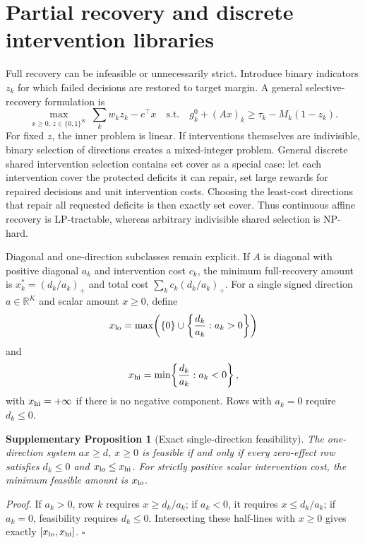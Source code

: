 \documentclass[11pt,letterpaper]{article}
\theoremstyle{plain}
\newtheorem{proposition}{Supplementary Proposition}
\newcommand{\1}{\mathbf 1}
\begin{document}
\section{Partial recovery and discrete intervention libraries}
Full recovery can be infeasible or unnecessarily strict. Introduce binary indicators $z_k$ for which failed decisions are restored to target margin. A general selective-recovery formulation is
\begin{equation}
 \max_{x\ge0,\,z\in\{0,1\}^K}\ \sum_k w_k z_k-c^\top x
\quad\text{s.t.}\quad
 g_k^0+(Ax)_k\ge\tau_k-M_k(1-z_k).
\label{eq:s_partial_recovery}
\end{equation}
For fixed $z$, the inner problem is linear. If interventions themselves are indivisible, binary selection of directions creates a mixed-integer problem. General discrete shared intervention selection contains set cover as a special case: let each intervention cover the protected deficits it can repair, set large rewards for repaired decisions and unit intervention costs. Choosing the least-cost directions that repair all requested deficits is then exactly set cover. Thus continuous affine recovery is LP-tractable, whereas arbitrary indivisible shared selection is NP-hard.

Diagonal and one-direction subclasses remain explicit. If $A$ is diagonal with positive diagonal $a_k$ and intervention cost $c_k$, the minimum full-recovery amount is $x_k^*=(d_k/a_k)_+$ and total cost $\sum_k c_k(d_k/a_k)_+$. For a single signed direction $a\in\mathbb R^K$ and scalar amount $x\ge0$, define
\begin{equation}
 x_{\rm lo}=\max\!\left(\{0\}\cup\left\{\frac{d_k}{a_k}:a_k>0\right\}\right)
\label{eq:r137_xlo}
\end{equation}
and
\begin{equation}
 x_{\rm hi}=\min\!\left\{\frac{d_k}{a_k}:a_k<0\right\},
\label{eq:r137_xhi}
\end{equation}
with $x_{\rm hi}=+\infty$ if there is no negative component. Rows with $a_k=0$ require $d_k\le0$.

\begin{proposition}[Exact single-direction feasibility]
The one-direction system $ax\ge d$, $x\ge0$ is feasible if and only if every zero-effect row satisfies $d_k\le0$ and $x_{\rm lo}\le x_{\rm hi}$. For strictly positive scalar intervention cost, the minimum feasible amount is $x_{\rm lo}$.
\end{proposition}
\textit{Proof.} If $a_k>0$, row $k$ requires $x\ge d_k/a_k$; if $a_k<0$, it requires $x\le d_k/a_k$; if $a_k=0$, feasibility requires $d_k\le0$. Intersecting these half-lines with $x\ge0$ gives exactly $[x_{\rm lo},x_{\rm hi}]$. $\square$
\end{document}
